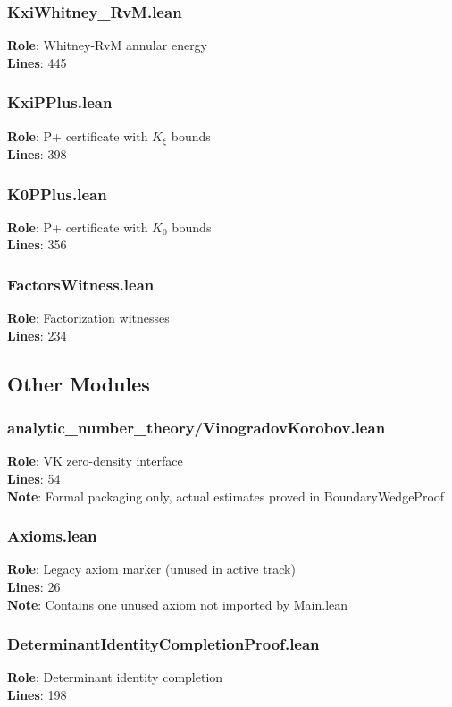 \documentclass[12pt,a4paper]{article}
\begin{document}
\subsubsection{KxiWhitney\_RvM.lean}
\textbf{Role}: Whitney-RvM annular energy\\
\textbf{Lines}: 445

\subsubsection{KxiPPlus.lean}
\textbf{Role}: P+ certificate with $K_\xi$ bounds\\
\textbf{Lines}: 398

\subsubsection{K0PPlus.lean}
\textbf{Role}: P+ certificate with $K_0$ bounds\\
\textbf{Lines}: 356

\subsubsection{FactorsWitness.lean}
\textbf{Role}: Factorization witnesses\\
\textbf{Lines}: 234

\subsection{Other Modules}

\subsubsection{analytic\_number\_theory/VinogradovKorobov.lean}
\textbf{Role}: VK zero-density interface\\
\textbf{Lines}: 54\\
\textbf{Note}: Formal packaging only, actual estimates proved in BoundaryWedgeProof

\subsubsection{Axioms.lean}
\textbf{Role}: Legacy axiom marker (unused in active track)\\
\textbf{Lines}: 26\\
\textbf{Note}: Contains one unused axiom not imported by Main.lean

\subsubsection{DeterminantIdentityCompletionProof.lean}
\textbf{Role}: Determinant identity completion\\
\textbf{Lines}: 198
\end{document}
